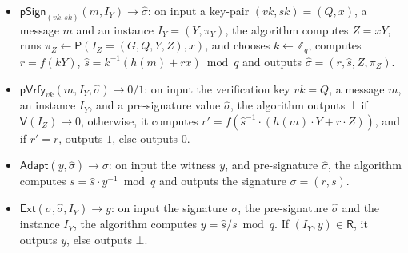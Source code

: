\documentclass{llncs}
\begin{document}
\begin{itemize}
\item $\mathsf{pSign}_{(vk,sk)}(m,I_Y)\rightarrow \hat{\sigma}$: on input a key-pair $(vk,sk)=(Q,x)$, a message $m$ and an instance $I_{Y}=(Y,\pi_Y)$, the algorithm computes $Z=xY$, runs $\pi_Z\leftarrow \mathsf{P}(I_Z=(G,Q,Y,Z),x)$, and chooses $k\leftarrow \mathbb{Z}_q$, computes $r=f(kY)$, $\hat{s}=k^{-1}(h(m)+rx) \bmod q$ and outputs $\hat{\sigma}=(r,\hat{s},Z,\pi_Z)$.

\item $\mathsf{pVrfy}_{vk}(m,I_Y,\hat{\sigma})\rightarrow 0/1$: on input the verification key $vk=Q$, a message $m$, an instance $I_{Y}$, and a pre-signature value $\hat{\sigma}$, the algorithm outputs $\bot$ if $\mathsf{V}(I_{Z})\rightarrow 0$, otherwise, it computes $r'=f(\hat{s}^{-1}\cdot (h(m)\cdot Y+r\cdot Z))$, and if $r'=r$, outputs $1$, else outputs $0$.

\item $\mathsf{Adapt}(y,\hat{\sigma})\rightarrow \sigma$: on input the witness $y$, and pre-signature $\hat{\sigma}$, the algorithm computes $s=\hat{s}\cdot y^{-1} \bmod q$ and outputs the signature $\sigma=(r,s)$.

\item $\mathsf{Ext}(\sigma,\hat{\sigma},I_Y)\rightarrow y$: on input the signature $\sigma$, the pre-signature $\hat{\sigma}$ and the instance $I_{Y}$, the algorithm computes $y=\hat{s}/s \bmod q$. If $(I_Y, y)\in \mathsf{R}$, it outputs $y$, else outputs $\bot$.
\end{itemize}
\end{document}
